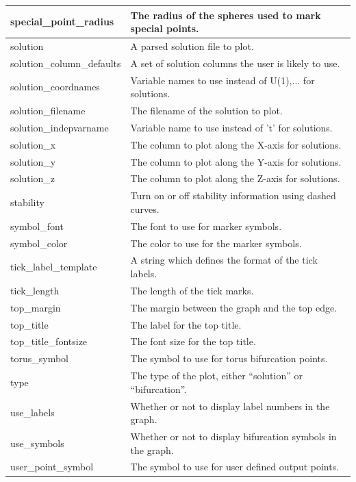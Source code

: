 \documentclass[12pt]{report}
\begin{document}
\begin{longtable}{| l | l |}
 \hline
 special\_point\_radius  &    The radius of the spheres used to mark special points. \\ 
 \hline
 solution  &  A parsed solution file to plot. \\
 \hline
 solution\_column\_defaults  & A set of solution columns the user is likely to use.\\
 \hline
 solution\_coordnames & Variable names to use instead of U(1),... for solutions. \\
 \hline
 solution\_filename  & The filename of the solution to plot. \\
 \hline
 solution\_indepvarname & Variable name to use instead of 't' for solutions. \\
 \hline
 solution\_x  &  The column to plot along the X-axis for solutions. \\
 \hline
 solution\_y  & The column to plot along the Y-axis for solutions. \\
 \hline
 solution\_z  & The column to plot along the Z-axis for solutions. \\
 \hline
 stability  & Turn on or off stability information using dashed curves. \\
 \hline
 symbol\_font  &  The font to use for marker symbols. \\
 \hline
 symbol\_color  & The color to use for the marker symbols. \\
 \hline
 tick\_label\_template  & A string which defines the format of the tick labels. \\
 \hline
 tick\_length  &  The length of the tick marks. \\
 \hline
 top\_margin  & The margin between the graph and the top edge. \\
 \hline
 top\_title  &    The label for the top title. \\ 
 \hline
 top\_title\_fontsize  & The font size for the top title. \\ 
 \hline
 torus\_symbol  &    The symbol to use for torus bifurcation points. \\ 
 \hline
 type  & The type of the plot, either ``solution'' or ``bifurcation''. \\  
 \hline
 use\_labels &   Whether or not to display label numbers in the graph. \\ 
 \hline
 use\_symbols  & Whether or not to display bifurcation symbols in the graph. \\
 \hline
 user\_point\_symbol  &   The symbol to use for user defined output points. \\ 

\end{longtable}
\end{document}
